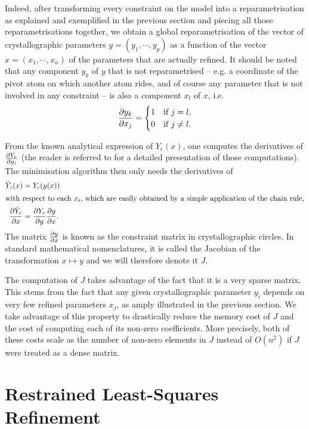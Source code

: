 \documentclass[pdf]{iucr}
\begin{document}
Indeed, after transforming every constraint on the model into a reparametrisation as explained and exemplified in the previous section and piecing all those reparametrisations together, we obtain a global reparametrisation of the vector of crystallographic parameters $y = (y_1, \cdots, y_p)$ as a function of the vector $x=(x_1, \cdots, x_n)$ of the parameters that are actually refined. It should be noted that any component $y_k$ of $y$ that is not reparametrised -- e.g. a coordinate of the pivot atom on which another atom rides, and of course any parameter that is not involved in any constraint --  is also a component $x_l$ of $x$, i.e. 
\begin{equation}
\frac{\partial y_k}{\partial x_j} = \begin{cases} 
   1& \text{if $j=l$},\\
   0& \text{if $j \neq l$}.
   \end{cases}
\end{equation}

 From the known analytical expression of $Y_c(x)$, one computes the derivatives of $\frac{\partial Y_c}{\partial y_i}$ (the reader is referred to  for a detailed presentation of those computations). The minimisation algorithm then only needs the derivatives of
\begin{align}
\tilde{Y}_c(x) &= Y_c(y(x)) \\
 \intertext{with respect to each $x_i$, which are easily obtained by a simple application of the chain rule,}
\frac{\partial \tilde{Y}_c}{\partial x} &= \frac{\partial Y_c}{\partial y} \frac{\partial y}{\partial x}.
\label{eqn:chainrule}
\end{align}
The matrix $\frac{\partial y}{\partial x}$ is known as the constraint matrix in crystallographic circles. In standard mathematical nomenclatures, it is called the Jacobian of the transformation $x \mapsto y$ and we will therefore denote it $J$.

The computation of $J$ takes advantage of the fact that it is a very sparse matrix. This stems from the fact that any given crystallographic parameter $y_i$ depends on very few refined parameters $x_j$, as amply illustrated in the previous section. We take advantage of this property to drastically reduce the memory cost of $J$ and the cost of computing each of its non-zero coefficients. More precisely, both of these costs scale as the number of non-zero elements in $J$ instead of $O(n^2)$ if $J$ were treated as a dense matrix.

\section{Restrained Least-Squares Refinement}
\label{sec:restraints}
\end{document}

